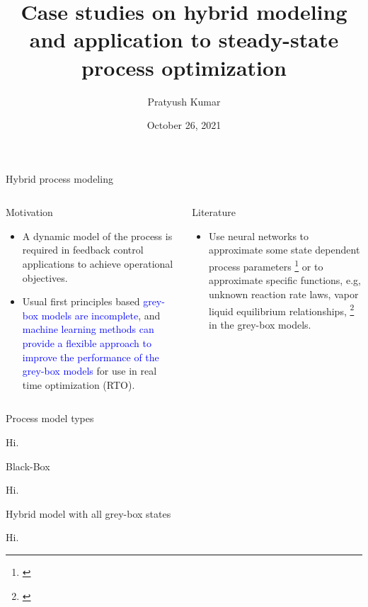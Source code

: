 \documentclass[xcolor=dvipsnames, 8pt]{beamer} %
\title{Case studies on hybrid modeling and application to steady-state process optimization}
\date{October 26, 2021}
\author[Pratyush Kumar]{\large Pratyush Kumar}
\institute[UCSB]{
	\begin{minipage}{4in}
		\vspace{-10pt}
		\centering
		\raisebox{-0.1\height}{\texttt{[image: UCSB\_seal]}}
	\end{minipage}
	\vspace{10pt}
	\newline
	{\large Department of chemical engineering}
	\vspace{10pt}
	\newline
	{\large Group Meeting Presentation}}
\begin{document}
\frame{\titlepage}



\begin{frame}{Hybrid process modeling}

	\begin{columns}
	\column{\textwidth}

	\begin{block}{Motivation}
		\begin{itemize}
		\item A dynamic model of the process is required in feedback
		control applications to achieve operational objectives. \pause
		\item Usual first principles based \textcolor{blue}{grey-box models are
		incomplete}, and \textcolor{blue}{machine learning methods can provide a
		flexible approach to improve the performance of the grey-box
		models} for use in real time optimization (RTO).
		\end{itemize}
	  \end{block}
	  \pause
	  \bigskip
	\begin{block}{Literature}
	  \begin{itemize}
	  \item Use neural networks to approximate some state dependent process
	  parameters \footnote[frame]{\cite{psichogios:ungar:1992}} or to
	  approximate specific functions, e.g, unknown reaction rate laws, vapor
	  liquid equilibrium relationships,
	  \footnote[frame]{\cite{lovelett:avalos:kevrekidis:2019,
	  chen:ierapetritou:2020, bangi:kwon:2020}} in the grey-box models.	
	  \end{itemize}
	\end{block}
  
\end{columns}
\end{frame}

\begin{frame}{Process model types}

	Hi.

\end{frame}

\begin{frame}{Black-Box}

	Hi.

\end{frame}

\begin{frame}{Hybrid model with all grey-box states}

	Hi.

\end{frame}
\end{document}
